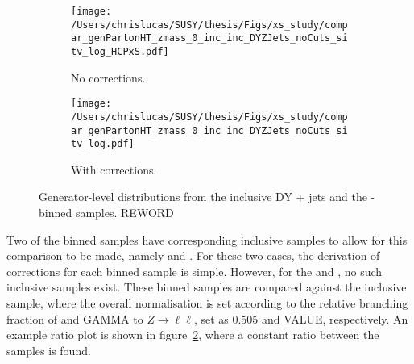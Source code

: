 \begin{figure}[b!]
  \centering
  \begin{subfigure}[b]{0.45\textwidth}
    \texttt{[image: /Users/chrislucas/SUSY/thesis/Figs/xs\_study/compar\_genPartonHT\_zmass\_0\_inc\_inc\_DYZJets\_noCuts\_sitv\_log\_HCPxS.pdf]}
    \caption{No corrections.}
    \label{fig:xsec_study_before}
  \end{subfigure}             
  \begin{subfigure}[b]{0.45\textwidth}
    \texttt{[image: /Users/chrislucas/SUSY/thesis/Figs/xs\_study/compar\_genPartonHT\_zmass\_0\_inc\_inc\_DYZJets\_noCuts\_sitv\_log.pdf]}
    \caption{With corrections.}
    \label{fig:xsec_study_after}
  \end{subfigure}             
  \caption{Generator-level \HTpart distributions from the
    inclusive DY + jets and the \HTpart-binned \zj
    samples. REWORD}
  \label{fig:xsec_study}
\end{figure}

Two of the binned samples have corresponding inclusive samples to allow for 
this comparison to be made, namely \wj and \dyj. For these two cases, the 
derivation of corrections for each \HTpart binned sample is simple. However, for
the \zj and \gj, no such inclusive samples exist. These binned samples are 
compared against the inclusive \dyj sample, where the overall normalisation is 
set according to the relative branching fraction of \zinv and GAMMA to
$Z \to \ell\ell$, set as 0.505 and VALUE, respectively. An example ratio plot is
shown in figure~\ref{fig:xsec_study_after}, where a constant ratio between the 
samples is found.

